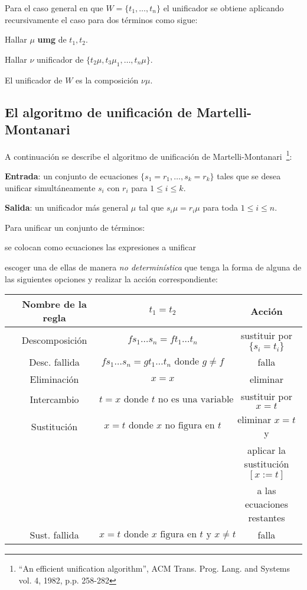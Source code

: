 \documentclass[11pt,letterpaper]{article}
\begin{document}
Para el caso general en que $W=\{t_1,\ldots,t_n\}$ el unificador se obtiene 
aplicando recursivamente el caso para dos términos como sigue:
\bi
\item Hallar $\mu$ \textbf{umg} de $t_1,t_2$.
\item Hallar $\nu$ unificador de $\{t_2\mu,t_3\mu_1,\ldots,t_n\mu\}$.
\item El unificador de $W$ es la composición $\nu\mu$.
\ei

\subsection{El algoritmo de unificación de Martelli-Montanari}

A continuación se describe el algoritmo de unificación de 
Martelli-Montanari~\footnote{``An efficient unification algorithm'', ACM Trans. 
Prog. Lang. and Systems vol. 4, 1982, p.p. 258-282}:

\bi
\item[] \textbf{Entrada}: un conjunto de ecuaciones 
$\{s_1=r_1,\ldots,s_k=r_k\}$ tales que 
se desea unificar simult\'aneamente $s_i$ con $r_i$ para $1\leq i\leq k$.
\item[] \textbf{Salida}: un unificador más general $\mu$ tal que 
$s_i\mu=r_i\mu$ para toda $1\leq i\leq n$.
\ei

Para unificar un conjunto de términos:
\bi
\item se colocan como ecuaciones las expresiones a unificar
\item escoger una de ellas de manera \textit{no determin\'istica} que tenga la 
forma de alguna de las siguientes opciones 
y realizar la acci\'on correspondiente:
\bc
\begin{tabular}{lc|c|c}
& Nombre de la regla &  $t_1 = t_2 $ &  Acci\'on\\\hline
{\sc [Desc]} & Descomposición &  $fs_1\dots s_n = ft_1\dots t_n$ 
  & \small{sustituir por  $\{s_i = t_i\}$} \\
{\sc [DFalla]} & Desc. fallida & 
  $fs_1\dots s_n=gt_1\dots t_n\text{ donde } g\neq f$  
  & \small{falla}\\
{\sc [Elim]} & Eliminación &  $x = x$ & \small{eliminar} \\
{\sc [Swap]} & Intercambio & 
  $t = x \text{ donde } t \text{ no es una variable }$
  & \small{sustituir por $x=t$}\\
{\sc [Sust]} & Sustitución &  $x = t \text{ donde } x \text{ no figura en } t$  
  &  \small{eliminar $x=t$ y }\\ 
  & & & \small{aplicar la sustituci\'on $[x:=t]$}\\ %
  & & & \small{a las ecuaciones restantes }\\
{\sc [SFalla]} & Sust. fallida & 
  $x = t \text{ donde } x \text{ figura en } t \text{ y } x\neq t$ 
  & \small{falla}
\end{tabular}
\ec
\end{document}
